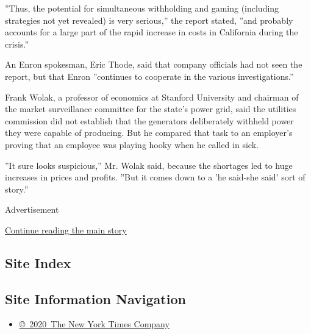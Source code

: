 ''Thus, the potential for simultaneous withholding and gaming (including
strategies not yet revealed) is very serious,'' the report stated, ''and
probably accounts for a large part of the rapid increase in costs in
California during the crisis.''

An Enron spokesman, Eric Thode, said that company officials had not seen
the report, but that Enron ''continues to cooperate in the various
investigations.''

Frank Wolak, a professor of economics at Stanford University and
chairman of the market surveillance committee for the state's power
grid, said the utilities commission did not establish that the
generators deliberately withheld power they were capable of producing.
But he compared that task to an employer's proving that an employee was
playing hooky when he called in sick.

''It sure looks suspicious,'' Mr. Wolak said, because the shortages led
to huge increases in prices and profits. ''But it comes down to a 'he
said-she said' sort of story.''

Advertisement

\protect\hyperlink{after-bottom}{Continue reading the main story}

\hypertarget{site-index}{%
\subsection{Site Index}\label{site-index}}

\hypertarget{site-information-navigation}{%
\subsection{Site Information
Navigation}\label{site-information-navigation}}

\begin{itemize}
\tightlist
\item
  \href{https://help.nytimes3xbfgragh.onion/hc/en-us/articles/115014792127-Copyright-notice}{©~2020~The
  New York Times Company}
\end{itemize}

